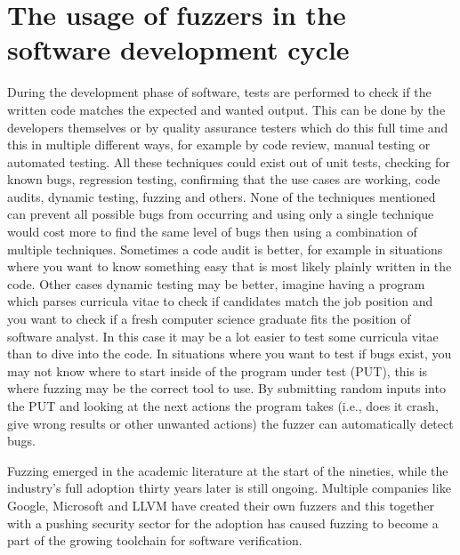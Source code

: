 \section{The usage of fuzzers in the software development cycle}
\label{intro:SoftwareDevelopmentCycle}
During the development phase of software, tests are performed to check if the written code matches the expected and wanted output. This can be done by the developers themselves or by quality assurance testers which do this full time and this in multiple different ways, for example by code review, manual testing or automated testing. All these techniques could exist out of unit tests, checking for known bugs, regression testing, confirming that the use cases are working, code audits, dynamic testing, fuzzing and others. None of the techniques mentioned can prevent all possible bugs from occurring and using only a single technique would cost more to find the same level of bugs then using a combination of multiple techniques. Sometimes a code audit is better, for example in situations where you want to know something easy that is most likely plainly written in the code. Other cases dynamic testing may be better, imagine having a program which parses curricula vitae to check if candidates match the job position and you want to check if a fresh computer science graduate fits the position of software analyst. In this case it may be a lot easier to test some curricula vitae than to dive into the code. In situations where you want to test if bugs exist, you may not know where to start inside of the program under test (PUT), this is where fuzzing may be the correct tool to use. By submitting random inputs into the PUT and looking at the next actions the program takes (i.e., does it crash, give wrong results or other unwanted actions) the fuzzer can automatically detect bugs.

Fuzzing emerged in the academic literature at the start of the nineties, while the industry's full adoption thirty years later is still ongoing. Multiple companies like Google, Microsoft and LLVM have created their own fuzzers and this together with a pushing security sector for the adoption has caused fuzzing to become a part of the growing toolchain for software verification.

